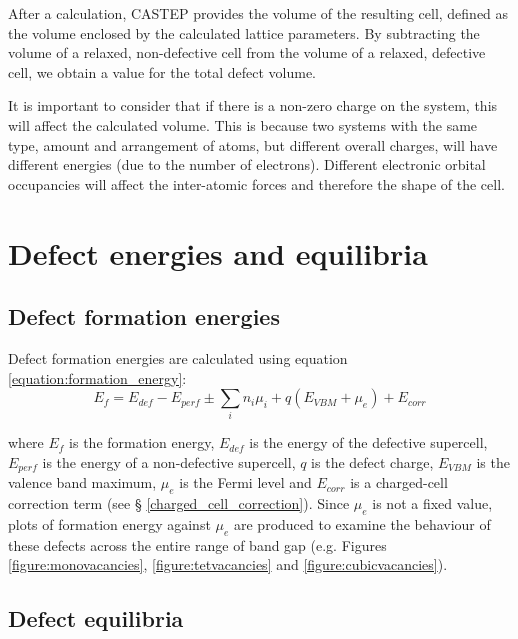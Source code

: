 After a calculation, CASTEP provides the volume of the resulting cell, defined as the volume enclosed by the calculated lattice parameters. By subtracting the volume of a relaxed, non-defective cell from the volume of a relaxed, defective cell, we obtain a value for the total defect volume. %

It is important to consider that if there is a non-zero charge on the system, this will affect the calculated volume. This is because two systems with the same type, amount and arrangement of atoms, but different overall charges, will have different energies (due to the number of electrons). Different electronic orbital occupancies will affect the inter-atomic forces and therefore the shape of the cell. 

\section{Defect energies and equilibria} 

\subsection{Defect formation energies}

Defect formation energies are calculated using equation \ref{equation:formation_energy}:
\begin{equation} \label{equation:formation_energy}
    E_{f} = E_{def} - E_{perf} \pm \sum_{i} n_i\mu_i + q(E_{VBM} + \mu_{e}) + E_{corr}
\end{equation}

where $E_{f}$ is the formation energy, $E_{def}$ is the energy of the defective supercell, $E_{perf}$ is the energy of a non-defective supercell, $q$ is the defect charge, $E_{VBM}$ is the valence band maximum, $\mu_{e}$ is the Fermi level and $E_{corr}$ is a charged-cell correction term (see § \ref{charged_cell_correction}). Since $\mu_{e}$ is not a fixed value, plots of formation energy against $\mu_{e}$ are produced to examine the behaviour of these defects across the entire range of band gap (e.g. Figures \ref{figure:monovacancies}, \ref{figure:tetvacancies} and \ref{figure:cubicvacancies}).

\subsection{Defect equilibria} \label{brouwer_method} %

